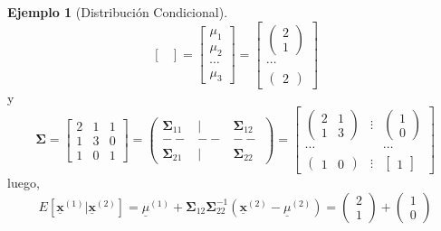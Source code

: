 \documentclass[
]{book}
\theoremstyle{definition}
\theoremstyle{definition}
\newtheorem{example}{Ejemplo}[chapter]
\theoremstyle{definition}
\theoremstyle{definition}
\theoremstyle{remark}
\begin{document}
\begin{example}[Distribución Condicional]
\[\begin{bmatrix}
\end{bmatrix}=\begin{bmatrix}
\mu_{1} \\ \mu_2 \\ \cdots \\ \mu_{3}
\end{bmatrix}=\begin{bmatrix}
\begin{pmatrix}
2 \\ 1
\end{pmatrix}
\\ \cdots \\ \begin{pmatrix}
2
\end{pmatrix}
\end{bmatrix}
\]
y
\[
\mathbf{\Sigma}=\begin{bmatrix}
2 & 1 &1 \\
1 & 3 & 0 \\
1 & 0 & 1
\end{bmatrix}=\begin{pmatrix}
\mathbf{\Sigma}_{11} & | & \mathbf{\Sigma}_{12} \\
-- & -- & -- \\
\mathbf{\Sigma}_{21} & | &\mathbf{\Sigma}_{22}
\end{pmatrix}=\begin{bmatrix}
\begin{pmatrix}
2 & 1 \\ 1 & 3
\end{pmatrix} & \vdots & \begin{pmatrix}
1 \\ 0
\end{pmatrix} \\
\cdots & & \cdots \\
\begin{pmatrix}
1 & 0
\end{pmatrix} & \vdots & \begin{bmatrix}
1
\end{bmatrix}
\end{bmatrix}
\]
luego,
\[
E[\underline{\mathbf{x}}^{(1)} | \underline{\mathbf{x}}^{(2)} ]=\underline{\mu}^{(1)}+\mathbf{\Sigma}_{12}\mathbf{\Sigma}_{22}^{-1}\left(\underline{\mathbf{x}}^{(2)}-
\underline{\mu}^{(2)}\right)=\begin{pmatrix}
2 \\1
\end{pmatrix}+\begin{pmatrix}
1 \\ 0

\end{pmatrix}\]
\end{example}
\end{document}
